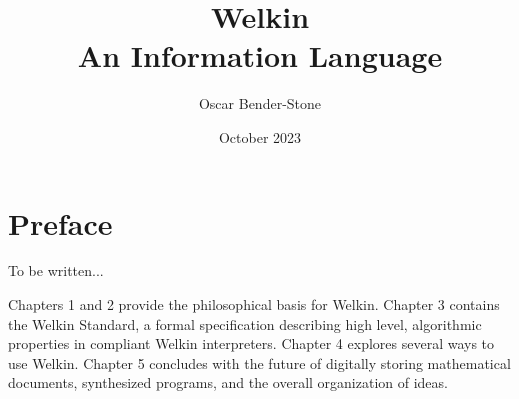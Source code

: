 \documentclass[leqno]{book}
\title{Welkin \\
  An Information Language}
\author{Oscar Bender-Stone}
\date{October 2023}
\theoremstyle{definition}
\begin{document}
\maketitle


\chapter*{Preface}

To be written...


Chapters 1 and 2 provide the philosophical basis for Welkin. Chapter 3 contains the Welkin Standard, a formal specification describing high level, algorithmic properties in compliant Welkin interpreters. Chapter 4 explores several ways to use Welkin. Chapter 5 concludes with the future of digitally storing mathematical documents, synthesized programs, and the overall organization of ideas.


\mainmatter





\end{document}
